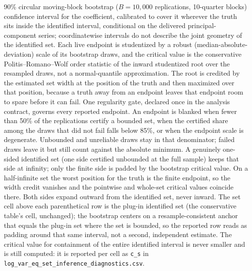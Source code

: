 \begin{table}[!htbp]
\begin{threeparttable}
\begin{tablenotes}[flushleft]
90\% circular moving-block bootstrap ($B=10{,}000$ replications, 10-quarter blocks) confidence interval for the coefficient, calibrated to cover it wherever the truth sits inside the identified interval, conditional on the delivered principal-component series; coordinatewise intervals do not describe the joint geometry of the identified set. Each live endpoint is studentized by a robust (median-absolute-deviation) scale of its bootstrap draws, and the critical value is the conservative Politis--Romano--Wolf order statistic of the inward studentized root over the resampled draws, not a normal-quantile approximation. The root is credited by the estimated set width at the position of the truth and then maximized over that position, because a truth away from an endpoint leaves that endpoint room to spare before it can fail. One regularity gate, declared once in the analysis contract, governs every reported endpoint. An endpoint is blanked when fewer than 50\% of the replications certify a bounded set, when the certified share among the draws that did not fail falls below 85\%, or when the endpoint scale is degenerate. Unbounded and unreliable draws stay in that denominator; failed draws leave it but still count against the absolute minimum. A genuinely one-sided identified set (one side certified unbounded at the full sample) keeps that side at infinity; only the finite side is padded by the bootstrap critical value. On a half-infinite set the worst position for the truth is the finite endpoint, so the width credit vanishes and the pointwise and whole-set critical values coincide there. Both sides expand outward from the identified set, never inward. The set cell above each parenthetical row is the plug-in identified set (the conservative table's cell, unchanged); the bootstrap centers on a resample-consistent anchor that equals the plug-in set where the set is bounded, so the reported row reads as padding around that same interval, not a second, independent estimate. The critical value for containment of the entire identified interval is never smaller and is still computed: it is reported per cell as \texttt{c\_s} in \texttt{log\_var\_eq\_set\_inference\_diagnostics.csv}.
\end{tablenotes}
\end{threeparttable}
\end{table}
\clearpage

